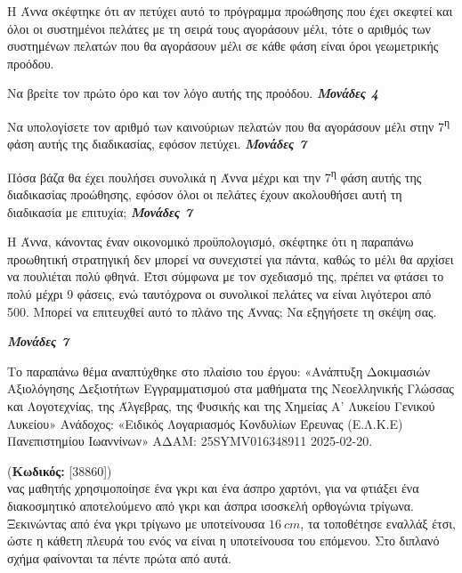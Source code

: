 \documentclass[11pt,a4paper,twoside]{book}
\newcounter{askhsh}[chapter]
\renewcommand{\theaskhsh}{
	\bf{\titlefont{\Large{\thechapter}}.\arabic{askhsh}}
}
\newcommand{\Askhsh}[2]{\refstepcounter{askhsh}{\titlefont{Άσκηση\theaskhsh} - \textcolor{maincolor}{ΘΕΜΑ #2}} (\small{\textbf{Κωδικός:} #1})\\}{}
\newcommand{\monades}[1]{
\hspace*{\fill}
\textbf{\textit{\textcolor{maincolor}{Μονάδες #1}}}}
\begin{document}
\begin{alist}
\item Η Άννα σκέφτηκε ότι αν πετύχει αυτό το πρόγραμμα προώθησης που έχει σκεφτεί και όλοι οι συστημένοι πελάτες με τη σειρά τους αγοράσουν μέλι, τότε ο αριθμός των συστημένων πελατών που θα αγοράσουν μέλι σε κάθε φάση είναι όροι γεωμετρικής προόδου.

\begin{rlist}
\item
  Να βρείτε τον πρώτο όρο και τον λόγο αυτής της προόδου.\monades{4}

\item
  Να υπολογίσετε τον αριθμό των καινούριων πελατών που θα αγοράσουν μέλι στην 7\textsuperscript{η} φάση αυτής της διαδικασίας, εφόσον πετύχει.\monades{7}

\item
  Πόσα βάζα θα έχει πουλήσει συνολικά η Άννα μέχρι και την 7\textsuperscript{η} φάση αυτής της διαδικασίας προώθησης, εφόσον όλοι οι πελάτες έχουν ακολουθήσει αυτή τη διαδικασία με επιτυχία;\monades{7}
\end{rlist}
\item Η Άννα, κάνοντας έναν οικονομικό προϋπολογισμό, σκέφτηκε ότι η παραπάνω προωθητική στρατηγική δεν μπορεί να συνεχιστεί για πάντα, καθώς το μέλι θα αρχίσει να πουλιέται πολύ φθηνά. Έτσι σύμφωνα με τον σχεδιασμό της, πρέπει να φτάσει το πολύ μέχρι 9 φάσεις, ενώ ταυτόχρονα οι συνολικοί πελάτες να είναι λιγότεροι από 500. Μπορεί να επιτευχθεί αυτό το πλάνο της Άννας; Να εξηγήσετε τη σκέψη σας.
\monades{7}
\end{alist}
{\footnotesize Το παραπάνω θέμα αναπτύχθηκε στο πλαίσιο του έργου: «Ανάπτυξη Δοκιμασιών Αξιολόγησης Δεξιοτήτων Εγγραμματισμού στα μαθήματα της Νεοελληνικής Γλώσσας και Λογοτεχνίας, της Άλγεβρας, της Φυσικής και της Χημείας Α' Λυκείου Γενικού Λυκείου» Ανάδοχος: «Ειδικός Λογαριασμός Κονδυλίων Έρευνας (Ε.Λ.Κ.Ε) Πανεπιστημίου Ιωαννίνων» ΑΔΑΜ: 25SYMV016348911 2025-02-20.}


\vspace{4mm}

\Askhsh{[38860]}
Ένας μαθητής χρησιμοποίησε ένα γκρι και ένα άσπρο χαρτόνι, για να φτιάξει ένα διακοσμητικό αποτελούμενο από γκρι και άσπρα ισοσκελή ορθογώνια τρίγωνα. Ξεκινώντας από ένα γκρι τρίγωνο με υποτείνουσα $16\ cm$, τα τοποθέτησε εναλλάξ έτσι, ώστε η κάθετη πλευρά του ενός να είναι η υποτείνουσα του επόμενου. Στο διπλανό σχήμα φαίνονται τα πέντε πρώτα από αυτά.
\end{document}
